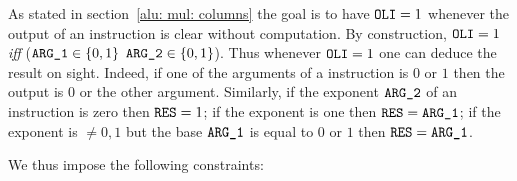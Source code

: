 As stated in section~\ref{alu: mul: columns}
the goal is to have $\texttt{OLI} = 1$ whenever the output of an instruction is clear without computation.
By construction, $\texttt{OLI} = 1$ \emph{iff} \big($\texttt{ARG}\texttt{\_1} \in \{0,1\}$ \OR $\texttt{ARG}\texttt{\_2} \in \{0,1\}$\big).
Thus whenever $\texttt{OLI} = 1$ one can deduce the result on sight.
Indeed, if one of the arguments of a  instruction is $0$ or $1$ then the output is $0$ or the other argument.
Similarly, if the exponent $\texttt{ARG}\texttt{\_2}$ of an  instruction is zero then $\texttt{RES} = 1$;
if the exponent is one then $\texttt{RES} = \texttt{ARG}\texttt{\_1}$; if the exponent is $\neq 0, 1$ but the base $\texttt{ARG}\texttt{\_1}$ is equal to $0$ or $1$ then $\texttt{RES} = \texttt{ARG}\texttt{\_1}$.
\begin{center}
\end{center}
We thus impose the following constraints:
